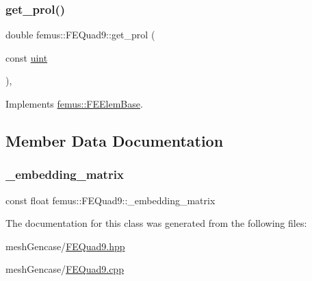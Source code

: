 \mbox{\label{classfemus_1_1_f_e_quad9_ab4f40a93ba2ea9c54243a8b0d8402edc}} 
\subsubsection{\texorpdfstring{get\+\_\+prol()}{get\_prol()}}
{\footnotesize\ttfamily double femus\+::\+F\+E\+Quad9\+::get\+\_\+prol (\begin{DoxyParamCaption}\item[{const \mbox{\hyperlink{_typedefs_8hpp_a91ad9478d81a7aaf2593e8d9c3d06a14}{uint}}}]{ }\end{DoxyParamCaption})\hspace{0.3cm}{\ttfamily [inline]}, {\ttfamily [virtual]}}



Implements \mbox{\hyperlink{classfemus_1_1_f_e_elem_base_ac82326cdc7cb02329c7be9547d56fad4}{femus\+::\+F\+E\+Elem\+Base}}.



\subsection{Member Data Documentation}
\mbox{\label{classfemus_1_1_f_e_quad9_a5ee9abeea6cd4e80b01ff1a3a0f26550}} 
\subsubsection{\texorpdfstring{\+\_\+embedding\+\_\+matrix}{\_embedding\_matrix}}
{\footnotesize\ttfamily const float femus\+::\+F\+E\+Quad9\+::\+\_\+embedding\+\_\+matrix\hspace{0.3cm}{\ttfamily [static]}}



The documentation for this class was generated from the following files\+:\begin{DoxyCompactItemize}
\item 
mesh\+Gencase/\mbox{\hyperlink{_f_e_quad9_8hpp}{F\+E\+Quad9.\+hpp}}\item 
mesh\+Gencase/\mbox{\hyperlink{_f_e_quad9_8cpp}{F\+E\+Quad9.\+cpp}}\end{DoxyCompactItemize}
